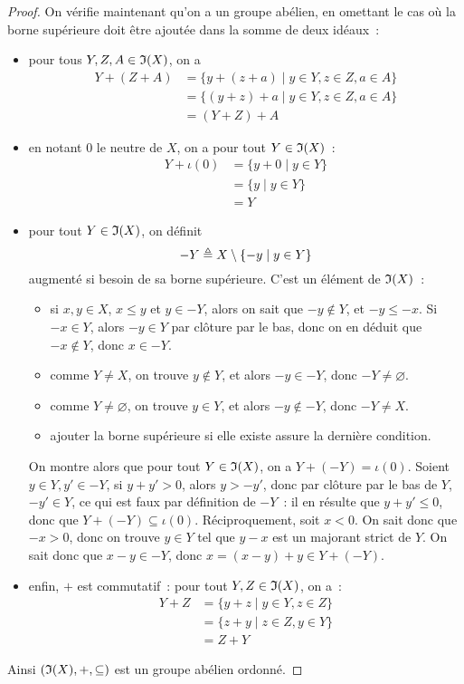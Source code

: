 \begin{proof}
  On vérifie maintenant qu'on a un groupe abélien, en omettant le cas où la
  borne supérieure doit être ajoutée dans la somme de deux idéaux~:
  \begin{itemize}
  \item pour tous $Y,Z,A\in\mathfrak{I}(X)$, on a
    \begin{align*}
      Y + (Z + A) &= \{ y + (z + a) \mid y \in Y, z \in Z, a \in A\}\\
      &= \{ (y + z) + a \mid y \in Y, z \in Z, a \in A\}\\
      &= (Y + Z) + A
    \end{align*}
  \item en notant $0$ le neutre de $X$, on a pour tout $Y \in \mathfrak{I}(X)$~:
    \begin{align*}
      Y + \iota(0) &= \{ y + 0 \mid y \in Y \}\\
      &= \{y \mid y \in Y \}\\
      &= Y
    \end{align*}
  \item pour tout $Y\in \mathfrak{I}(X)$, on définit
    \[-Y \triangleq X \setminus \{ - y \mid y \in Y \}\]
    augmenté si besoin de sa borne supérieure. C'est un élément de $\mathfrak{I}(X)$~:
    \begin{itemize}
    \item si $x,y \in X$, $x\leq y$ et $y \in -Y$, alors on sait que
      $-y\notin Y$, et $-y \leq -x$. Si $-x \in Y$, alors $-y \in Y$ par clôture
      par le bas, donc on en déduit que $-x \notin Y$, donc $x \in -Y$.
    \item comme $Y \neq X$, on trouve $y\notin Y$, et alors $-y \in -Y$, donc
      $-Y\neq \varnothing$.
    \item comme $Y \neq \varnothing$, on trouve $y\in Y$, et alors
      $-y \notin -Y$, donc $-Y\neq X$.
    \item ajouter la borne supérieure si elle existe assure la dernière
      condition.
    \end{itemize}
    On montre alors que pour tout $Y \in \mathfrak{I}(X)$, on a
    $Y + (-Y) = \iota(0)$. Soient $y\in Y, y' \in -Y$, si $y + y' > 0$, alors
    $y > - y'$, donc par clôture par le bas de $Y$, $-y' \in Y$, ce qui est
    faux par définition de $-Y$~: il en résulte que $y + y' \leq 0$, donc que
    $Y + (-Y) \subseteq \iota(0)$. Réciproquement, soit $x < 0$. On sait donc
    que $-x > 0$, donc on trouve $y \in Y$ tel que $y - x$ est un majorant
    strict de $Y$. On sait donc que $x - y \in - Y$, donc
    $x = (x - y) + y \in Y + (-Y)$.
  \item enfin, $+$ est commutatif~: pour tout $Y,Z \in \mathfrak{I}(X)$, on a~:
    \begin{align*}
      Y + Z &= \{ y + z \mid y \in Y, z \in Z \}\\
      &= \{ z + y \mid z \in Z, y \in Y \}\\
      &= Z + Y
    \end{align*}
  \end{itemize}
  Ainsi $(\mathfrak{I}(X),+,\subseteq)$ est un groupe abélien ordonné.
\end{proof}

